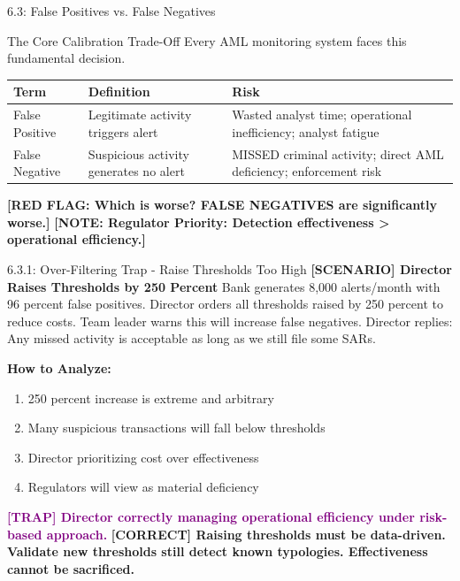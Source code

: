 \documentclass[11pt,a4paper]{beamer}
\newcommand{\trap}[1]{\textcolor{purple}{\textbf{[TRAP] #1}}}
\newcommand{\correct}[1]{\textcolor{green!50!black}{\textbf{[CORRECT] #1}}}
\newcommand{\scenario}[1]{\textcolor{blue!70!black}{\textbf{[SCENARIO] #1}}}
\newcommand{\redflag}[1]{\textcolor{red!80!black}{\textbf{[RED FLAG: #1]}}}
\newcommand{\bluenote}[1]{\textcolor{blue!80!black}{\textbf{[NOTE: #1]}}}  %
\begin{document}

\begin{frame}{6.3: False Positives vs. False Negatives}
	\begin{block}{The Core Calibration Trade-Off}
		Every AML monitoring system faces this fundamental decision.
	\end{block}
	\begin{tabular}{p{}|p{}|p{}}
		\hline
		\rowcolor{lightgray}
		\textbf{Term} & \textbf{Definition} & \textbf{Risk} \\
		\hline
		False Positive & Legitimate activity triggers alert & Wasted analyst time; operational inefficiency; analyst fatigue \\
		\hline
		False Negative & Suspicious activity generates no alert & MISSED criminal activity; direct AML deficiency; enforcement risk \\
		\hline
	\end{tabular}
	\vspace{0.2cm}
	\redflag{Which is worse? FALSE NEGATIVES are significantly worse.}
	\bluenote{Regulator Priority: Detection effectiveness > operational efficiency.}
\end{frame}

\begin{frame}{6.3.1: Over-Filtering Trap - Raise Thresholds Too High}
	\scenario{Director Raises Thresholds by 250 Percent}
	Bank generates 8,000 alerts/month with 96 percent false positives. Director orders all thresholds raised by 250 percent to reduce costs. Team leader warns this will increase false negatives. Director replies: Any missed activity is acceptable as long as we still file some SARs.
	
	\vspace{0.1cm}
	\textbf{How to Analyze:}
	\begin{enumerate}
		\item 250 percent increase is extreme and arbitrary
		\item Many suspicious transactions will fall below thresholds
		\item Director prioritizing cost over effectiveness
		\item Regulators will view as material deficiency
	\end{enumerate}
	\trap{Director correctly managing operational efficiency under risk-based approach.}
	\correct{Raising thresholds must be data-driven. Validate new thresholds still detect known typologies. Effectiveness cannot be sacrificed.}
\end{frame}
\end{document}
